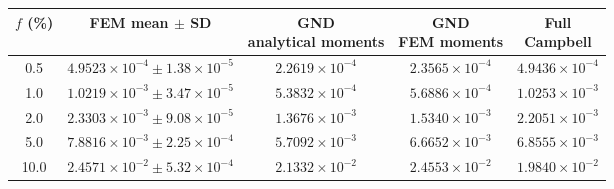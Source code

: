\begin{tabular}{@{}ccccc@{}}
\toprule
$f$ (\%) & FEM mean $\pm$ SD & \shortstack{GND\\analytical moments} & \shortstack{GND\\FEM moments} & \shortstack{Full\\Campbell}\\
\midrule
0.5 & $4.9523\times10^{-4}\pm1.38\times10^{-5}$ & $2.2619\times10^{-4}$ & $2.3565\times10^{-4}$ & $4.9436\times10^{-4}$ \\
1.0 & $1.0219\times10^{-3}\pm3.47\times10^{-5}$ & $5.3832\times10^{-4}$ & $5.6886\times10^{-4}$ & $1.0253\times10^{-3}$ \\
2.0 & $2.3303\times10^{-3}\pm9.08\times10^{-5}$ & $1.3676\times10^{-3}$ & $1.5340\times10^{-3}$ & $2.2051\times10^{-3}$ \\
5.0 & $7.8816\times10^{-3}\pm2.25\times10^{-4}$ & $5.7092\times10^{-3}$ & $6.6652\times10^{-3}$ & $6.8555\times10^{-3}$ \\
10.0 & $2.4571\times10^{-2}\pm5.32\times10^{-4}$ & $2.1332\times10^{-2}$ & $2.4553\times10^{-2}$ & $1.9840\times10^{-2}$ \\
\bottomrule
\end{tabular}

